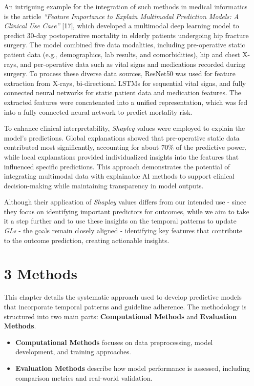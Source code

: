 \documentclass[
]{article}
\begin{document}
An intriguing example for the integration of such methods in medical
informatics is the article \emph{``Feature Importance to Explain
Multimodal Prediction Models: A Clinical Use Case''} {[}17{]}, which
developed a multimodal deep learning model to predict 30-day
postoperative mortality in elderly patients undergoing hip fracture
surgery. The model combined five data modalities, including
pre-operative static patient data (e.g., demographics, lab results, and
comorbidities), hip and chest X-rays, and per-operative data such as
vital signs and medications recorded during surgery. To process these
diverse data sources, ResNet50 was used for feature extraction from
X-rays, bi-directional LSTMs for sequential vital signs, and fully
connected neural networks for static patient data and medication
features. The extracted features were concatenated into a unified
representation, which was fed into a fully connected neural network to
predict mortality risk.

To enhance clinical interpretability, \emph{Shapley} values were
employed to explain the model's predictions. Global explanations showed
that pre-operative static data contributed most significantly,
accounting for about 70\% of the predictive power, while local
explanations provided individualized insights into the features that
influenced specific predictions. This approach demonstrates the
potential of integrating multimodal data with explainable AI methods to
support clinical decision-making while maintaining transparency in model
outputs.

Although their application of \emph{Shapley} values differs from our
intended use - since they focus on identifying important predictors for
outcomes, while we aim to take it a step further and to use these
insights on the temporal patterns to update \emph{GLs} - the goals
remain closely aligned - identifying key features that contribute to the
outcome prediction, creating actionable insights.

\section{3 Methods}\label{methods}

This chapter details the systematic approach used to develop predictive
models that incorporate temporal patterns and guideline adherence. The
methodology is structured into two main parts: \textbf{Computational
Methods} and \textbf{Evaluation Methods}.

\begin{itemize}
\item
  \textbf{Computational Methods} focuses on data preprocessing, model
  development, and training approaches.
\item
  \textbf{Evaluation Methods} describe how model performance is
  assessed, including comparison metrics and real-world validation.
\end{itemize}
\end{document}
